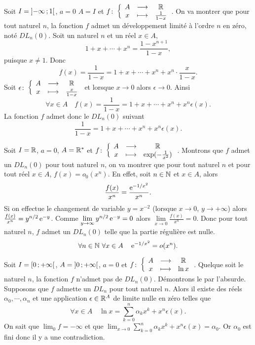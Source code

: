 Soit $I=\left] -\infty \, ;  1 \right[$, $a=0$ $A=I$ et $f\colon \left\{\begin{array}{ccc} A & \longrightarrow &\mathbb{R}\\ x & \longmapsto & \frac{1}{1-x} \end{array} \right.$. On va montrer que pour tout naturel $n$, la fonction $f$ admet un développement limité à l'ordre $n$ en zéro, noté $DL_n(0)$. Soit un naturel $n$ et un réel $x \in A$,
\begin{equation}
  1+x+ \dotsb + x^n = \frac{1-x^{n+1}}{1-x},
\end{equation}
puisque $x \neq 1$. Donc
\begin{equation}
  f(x) = \frac{1}{1-x}=1+x+ \dotsb + x^n + x^n \cdot \frac{x}{1-x}.
\end{equation}
Soit $\epsilon\colon \left\{\begin{array}{ccc} A & \longrightarrow &\mathbb{R}\\ x & \longmapsto & \frac{x}{1-x} \end{array} \right.$ et lorsque $x \to 0$ alors $\epsilon \to 0$. Ainsi
\begin{equation}
  \forall x \in A \quad f(x) = \frac{1}{1-x}=1+x+ \dotsb + x^n + x^n \epsilon(x).
\end{equation}
La fonction $f$ admet donc le $DL_n(0)$ suivant
\begin{equation}
  \frac{1}{1-x} = 1+x+ \dotsb + x^n + x^n \epsilon(x).
\end{equation}

Soit $I=\mathbb{R}$, $a=0$, $A=\mathbb{R}^*$ et $f\colon \left\{\begin{array}{ccc} A & \longrightarrow &\mathbb{R}\\ x & \longmapsto & \exp(-\frac{1}{x^2}) \end{array} \right.$. Montrons que $f$ admet un $DL_n(0)$ pour tout naturel $n$, on va montrer que pour tout naturel $n$ et pour tout réel $x \in A$, $f(x)=o_0(x^n)$. En effet, soit $n \in \mathbb{N}$ et $x \in A$, alors
\begin{equation}
  \frac{f(x)}{x^n}=\frac{\operatorname{e}^{-1/x^2}}{x^n}.
\end{equation}
Si on effectue le changement de variable $y=x^{-2}$ (lorsque $x \to 0$, $y \to + \infty$) alors $\frac{f(x)}{x^n}=y^{n/2}\operatorname{e}^{-y}$. Comme $\lim\limits_{y \to \infty} y^{n/2}\operatorname{e}^{-y} =0$ alors $\lim\limits_{x \to 0} \frac{f(x)}{x^n} =0$. Donc pour tout naturel $n$, $f$ admet un $DL_n(0)$ telle que la partie régulière est nulle.
\begin{equation}
  \forall n \in \mathbb{N} \ \forall x \in A \quad \operatorname{e}^{-1/x^2}=o(x^n).
\end{equation}

Soit $I=\left[ 0 \, ;  +\infty \right[$, $A=\left] 0 \, ;  +\infty \right[$, $a=0$ et $f\colon \left\{\begin{array}{ccc} A & \longrightarrow &\mathbb{R}\\ x & \longmapsto & \ln x \end{array} \right.$. Quelque soit le naturel $n$, la fonction $f$ n'admet pas de $DL_n(0)$. Démontrons le par l'absurde. Supposons que $f$ admette un $DL_n$ pour tout naturel $n$. Alors il existe des réels $\alpha_0, \cdots, \alpha_n$ et une application $\epsilon \in \mathbb{R}^A$ de limite nulle en zéro telles que
\begin{equation}
  \forall x \in A \quad \ln x =\sum_{k=0}^n \alpha_k x^k + x^n\epsilon(x).
\end{equation}
On sait que $\lim_0 f = -\infty$ et que $\lim_{x \to 0} \sum_{k=0}^n \alpha_k x^k + x^n\epsilon(x) = \alpha_0$. Or $\alpha_0$ est fini donc il y a une contradiction.

